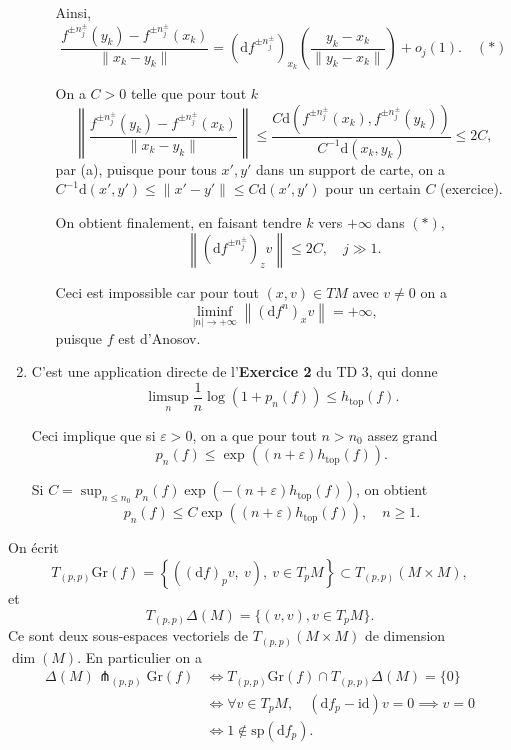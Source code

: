 \documentclass[a4paper,12pt,openany]{article}
\theoremstyle{plain}
\theoremstyle{definition}
\newcommand{\dd}{\mathrm{d}}
\newcommand{\id}{\mathrm{id}}
\begin{document}
\begin{enumerate}
\begin{enumerate}
%
Ainsi,
$$
\frac{f^{\pm n_j^\pm}(y_k) - f^{\pm n_j^\pm}(x_k)}{\|x_k - y_k\|} = \left(\dd f^{\pm n_j^\pm}\right)_{x_k}\left(\frac{y_k - x_k}{\|y_k - x_k\|}\right) + o_j(1). \quad (*)
$$





On a $C > 0$ telle que pour tout $k$
$$
\left\|\frac{f^{\pm n_j^\pm}(y_k) - f^{\pm n_j^\pm}(x_k)}{\|x_k - y_k\|}\right\| \leq \frac{C\dd\left(f^{\pm n_j^\pm}(x_k), f^{\pm n_j^\pm}(y_k)\right)}{C^{-1}\dd(x_k, y_k)} \leq 2C,
$$
par (a), puisque pour tous $x',y'$ dans un support de carte, on a $C^{-1}\dd(x',y')\leqslant \|x'-y'\| \leqslant C \dd(x',y')$ pour un certain $C$ (exercice).



On obtient finalement, en faisant tendre $k$ vers $+\infty$ dans $(*)$,
$$
\left\|\left(\dd f^{\pm n_j^\pm}\right)_zv\right\| \leqslant 2C, \quad j \gg 1.
$$

%
Ceci est impossible car pour tout $(x,v) \in TM$ avec $v \neq 0$ on a
$$
\liminf_{|n| \to +\infty} \left\|(\dd f^n)_xv\right\| = +\infty,
$$
puisque $f$ est d'Anosov.
\end{enumerate}
\item C'est une application directe de l'\textbf{Exercice 2} du TD 3, qui donne 
$$
\limsup_{n} \frac{1}{n} \log(1 + p_n(f)) \leqslant h_\mathrm{top}(f).
$$

%
Ceci implique que si $\varepsilon > 0$, on a que pour tout $n > n_0$ assez grand 
$$
p_n(f) \leqslant \exp((n+\varepsilon)h_\mathrm{top}(f)).
$$

%
Si $C  = \sup_{n \leqslant n_0} p_n(f) \exp\left({-(n+\varepsilon)h_\mathrm{top}(f)}\right)$, on obtient
$$
p_n(f) \leqslant C \exp((n+\varepsilon)h_\mathrm{top}(f)), \quad n \geqslant 1.
$$
\end{enumerate}

\vspace{0.6cm}

 \vspace{1.5mm}
 
\noindent On \'ecrit 
$$
T_{(p,p)} \mathrm{Gr}(f) = \left\{\left((\dd f)_pv,~v\right),~v\in T_pM\right\} \subset T_{(p,p)}(M \times M),
$$
et 
$$
T_{(p,p)}\Delta(M) = \{(v,v), v \in T_pM\}.
$$
Ce sont deux sous-espaces vectoriels de $T_{(p,p)}(M\times M)$ de dimension $\dim(M)$. En particulier on a 
$$
\begin{aligned}
\Delta(M) \pitchfork_{(p,p)} \mathrm{Gr}(f) &\iff T_{(p,p)} \mathrm{Gr}(f) \cap T_{(p,p)}\Delta(M) = \{0\} \\
&\iff \forall v \in T_pM, \quad  \left(\dd f_p - \id\right)v = 0 \implies v = 0 \\
&\iff 1 \notin \mathrm{sp}(\dd f_p).
\end{aligned}
$$
\end{document}

